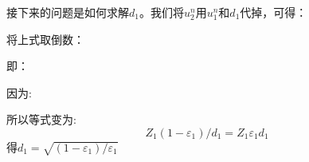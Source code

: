 \documentclass[UTF8]{ctexart} %
\begin{document}
			接下来的问题是如何求解$d_1$。我们将$u_2^n$用$u_1^n$和$d_1$代掉，可得：
			\begin{figure}[H]
			\end{figure}
			将上式取倒数：
			\begin{figure}[H]
			\end{figure}
			即：
			\begin{figure}[H]
			\end{figure}
			因为:
			\begin{figure}[H]
			\end{figure}
			所以等式变为:
			\[Z_1(1-\varepsilon_1)/d_1 = Z_1\varepsilon_1d_1\]
			得$d_1=\sqrt{(1-\varepsilon_1)/\varepsilon_1}$
			
\end{document}
